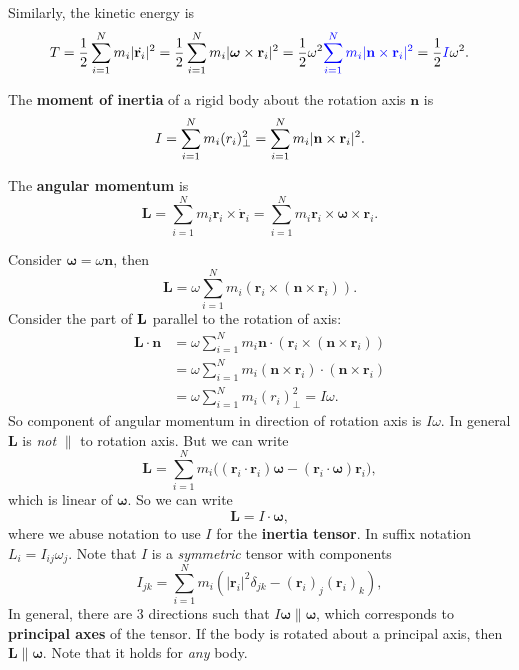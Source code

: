 Similarly, the kinetic energy is
\[
  T = \frac{1}{2}\sum_{i = 1}^N m_i|\dot{\mathbf{r}_i}|^2 =\frac{1}{2}\sum_{i = 1}^N m_i |\boldsymbol\omega\times \mathbf{r}_i|^2 = \frac{1}{2}\omega^2 {\color{blue}\sum_{i = 1}^N m_i  |{\bf n} \times {\bf r}_i|^2} = \frac{1}{2}{\color{blue}I}\omega^2.
\]
\begin{definition}
    The \textbf{moment of inertia} of a rigid body about the rotation axis $\mathbf{n}$ is
    \[
      I = \sum_{i = 1}^N m_i(r_i)_{\perp}^2 = \sum_{i = 1}^N m_i  |{\bf n} \times {\bf r}_i|^2.
    \]
\end{definition}
\begin{definition}
    The \textbf{angular momentum} is
    \[
      \mathbf{L} = \sum_{i=1}^N m_i \mathbf{r}_i \times \dot{\mathbf{r}}_i = \sum_{i=1}^N m_i \mathbf{r}_i \times \boldsymbol\omega \times \mathbf{r}_i.
    \]
\end{definition}

Consider $ \boldsymbol{\omega}=\omega \mathbf{n} $, then 
\[
    \mathbf{L} = \omega \sum_{i=1}^N m_i (\mathbf{r}_i \times (\mathbf{n} \times \mathbf{r}_i)).
\]
Consider the part of $ {\bf L} $ parallel to the rotation of axis: 
\begin{align*}
    \mathbf{L} \cdot \mathbf{n} &= \omega \sum_{i=1}^N m_i \mathbf{n}\cdot (\mathbf{r}_i \times (\mathbf{n} \times \mathbf{r}_i))\\
    &= \omega \sum_{i=1}^N m_i(\mathbf{n}\times \mathbf{r}_i)\cdot (\mathbf{n} \times \mathbf{r}_i)\\
    &= \omega \sum_{i=1}^{N}m_i(r_i)_{\perp}^2 = I\omega.
\end{align*}
So component of angular momentum in direction of rotation axis is $ I \omega $. In general $ \mathbf{L} $ is \textit{not} $\parallel$ to rotation axis. But we can write 
\[
  \mathbf{L} = \sum_{i=1}^N m_i\big((\mathbf{r}_i\cdot \mathbf{r}_i)\boldsymbol \omega - (\mathbf{r}_i \cdot \boldsymbol\omega)\mathbf{r}_i\big),
\]
which is linear of $\boldsymbol\omega$. So we can write
\[
  \mathbf{L} = I \cdot \boldsymbol \omega,
\]
where we abuse notation to use $I$ for the \textbf{inertia tensor}. In suffix notation $ L_i = I_{ij}\omega_j $. Note that $I$ is a \textit{symmetric} tensor with components
\[
  I_{jk} = \sum_{i=1}^N m_i(|\mathbf{r}_i|^2 \delta_{jk} - (\mathbf{r}_i)_j(\mathbf{r}_i)_k),
\]
In general, there are 3 directions such that $ I \boldsymbol{\omega} \parallel \boldsymbol{\omega} $, which corresponds to \textbf{principal axes} of the tensor. If the body is rotated about a principal axis, then $\mathbf{L}\parallel \boldsymbol\omega$. Note that it holds for \textit{any} body.

